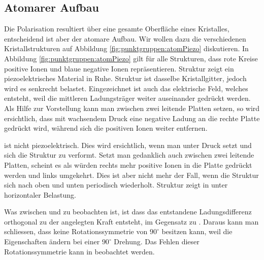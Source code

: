 \subsection{Atomarer Aufbau}
Die Polarisation resultiert über eine gesamte Oberfläche eines Kristalles, entscheidend ist aber der atomare Aufbau.
Wir wollen dazu die verschiedenen Kristallstrukturen auf Abbildung \ref{fig:punktgruppen:atomPiezo} diskutieren.
In Abbildung \ref{fig:punktgruppen:atomPiezo} gilt für alle Strukturen, dass rote Kreise positive Ionen und blaue negative Ionen repräsentieren. 
Struktur  zeigt ein piezoelektrisches Material in Ruhe. 
Struktur  ist dasselbe Kristallgitter, jedoch wird es senkrecht belastet. 
Eingezeichnet ist auch das elektrische Feld, welches entsteht, weil die mittleren Ladungsträger weiter auseinander gedrückt werden.
Als Hilfe zur Vorstellung kann man  zwischen zwei leitende Platten setzen, so wird ersichtlich, 
dass mit wachsendem Druck eine negative Ladung an die rechte Platte gedrückt wird, während sich die positiven Ionen weiter entfernen. 
\par
{} ist nicht piezoelektrisch.
Dies wird ersichtlich, wenn man  unter Druck setzt und sich die Struktur zu  verformt.
Setzt man  gedanklich auch zwischen zwei leitende Platten, 
scheint es als würden rechts mehr positive Ionen in die Platte gedrückt werden und links umgekehrt.
Dies ist aber nicht mehr der Fall, wenn die Struktur sich nach oben und unten periodisch wiederholt.
Struktur  zeigt  in unter horizontaler Belastung. 
\par
Was zwischen  und  zu beobachten ist, 
ist dass das entstandene Ladungsdifferenz orthogonal zu der angelegten Kraft entsteht, 
im Gegensatz zu .
Daraus kann man schliessen, dass  keine Rotationssymmetrie von \(90^\circ\) besitzen kann, 
weil die Eigenschaften ändern bei einer \(90^\circ\) Drehung. 
Das Fehlen dieser Rotationssymmetrie kann in  beobachtet werden. 

